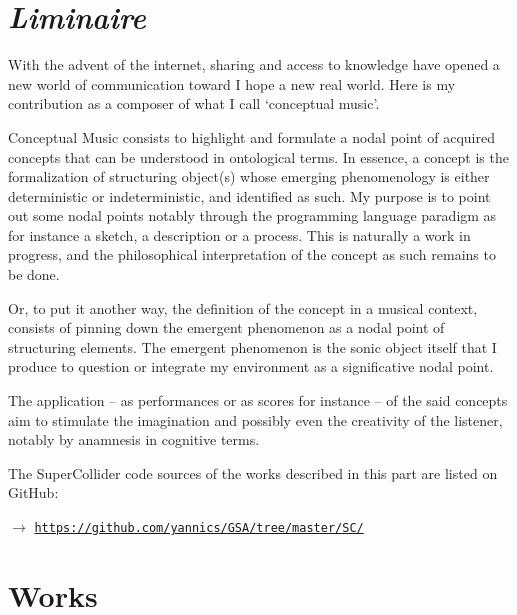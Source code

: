 \chapter*{\textsl{Liminaire}}

\thispagestyle{empty}

\bigskip

With the advent of the internet, sharing and access to knowledge have opened a new world of communication toward I hope a new real world. Here is my contribution as a composer of what I call `conceptual music'.						
\bigskip

Conceptual Music consists to highlight and formulate a nodal point of acquired concepts that can be understood in ontological terms. In essence, a concept is the formalization of structuring object(s) whose emerging phenomenology is either deterministic or indeterministic, and identified as such. My purpose is to point out some nodal points notably through the programming language paradigm as for instance a sketch, a description or a process. This is naturally a work in progress, and the philosophical interpretation of the concept as such remains to be done.						

Or, to put it another way, the definition of the concept in a musical context, consists of pinning down the emergent phenomenon as a nodal point of structuring elements. The emergent phenomenon is the sonic object itself that I produce to question or integrate my environment as a significative nodal point.

\bigskip
 
The application -- as performances or as scores for instance -- of the said concepts aim to stimulate the imagination and possibly even the creativity of the listener, notably by anamnesis in cognitive terms.										
\bigskip
\bigskip

The SuperCollider code sources of the works described in this part are listed on GitHub: 

$\rightarrow$ \href{https://github.com/yannics/GSA/tree/master/SC}{\texttt{\small https://github.com/yannics/GSA/tree/master/SC/}}  

\chapter*{Works}




